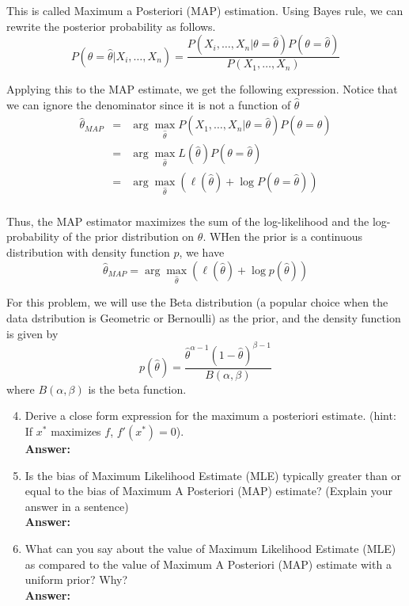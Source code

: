 \documentclass{article}
\begin{document}
This is called Maximum a Posteriori (MAP) estimation. Using Bayes rule, we can rewrite the posterior probability as follows.
$$P(\theta=\hat{\theta}|X_i,\dots,X_n)=\frac{P(X_i,\dots,X_n|\theta=\hat{\theta})P(\theta=\hat{\theta})}{P(X_1,\dots,X_n)}$$

Applying this to the MAP estimate, we get the following expression. Notice that we can ignore the denominator since it is not a function of $\hat{\theta}$
\begin{equation*}
\begin{array}{rcl}
\hat{\theta}_{MAP} & = & \arg\max_{\hat{\theta}}P(X_1,\dots,X_n|\theta=\hat{\theta})P(\theta=\hat{\theta}) \\
				   & = & \arg\max_{\hat{\theta}}L(\hat{\theta})P(\theta=\hat{\theta}) \\
				   & = & \arg\max_{\hat{\theta}}(\ell(\hat{\theta})+\log P(\theta=\hat{\theta})) \\
\end{array}
\end{equation*}

Thus, the MAP estimator maximizes the sum of the log-likelihood and the log-probability of the prior distribution on $\theta$. WHen the prior is a continuous distribution with density function $p$, we have
$$\hat{\theta}_{MAP}=\arg\max_{\hat{\theta}}(\ell(\hat{\theta})+\log{p(\hat{\theta})})$$

For this problem, we will use the Beta distribution (a popular choice when the data dstribution is Geometric or Bernoulli) as the prior, and the density function is given by
$$p(\hat{\theta})=\frac{\hat{\theta}^{\alpha-1}(1-\hat{\theta})^{\beta-1}}{B(\alpha,\beta)}$$
where $B(\alpha,\beta)$ is the beta function.

\begin{enumerate}
	\setcounter{enumi}{3}
	\item Derive a close form expression for the maximum a posteriori estimate. (hint: If $x^*$ maximizes $f$, $f'(x^*)=0$).
	\\\textbf{Answer:}
	
	\item Is the bias of Maximum Likelihood Estimate (MLE) typically greater than or equal to the bias of Maximum A Posteriori (MAP) estimate? (Explain your answer in a sentence)
	\\\textbf{Answer:}
	
	\item What can you say about the value of Maximum Likelihood Estimate (MLE) as compared to the value of Maximum A Posteriori (MAP) estimate with a uniform prior? Why?
	\\\textbf{Answer:}
\end{enumerate}
\end{document}
